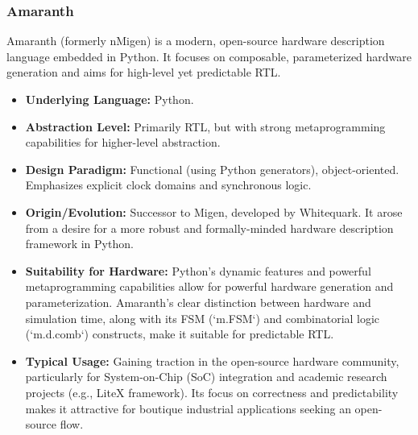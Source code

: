 \documentclass[sigconf, anonymous=false]{acmart} %
\begin{document}
\subsubsection{Amaranth}
Amaranth (formerly nMigen) is a modern, open-source hardware description language embedded in Python. It focuses on composable, parameterized hardware generation and aims for high-level yet predictable RTL.
\begin{itemize}
    \item \textbf{Underlying Language:} Python.
    \item \textbf{Abstraction Level:} Primarily RTL, but with strong metaprogramming capabilities for higher-level abstraction.
    \item \textbf{Design Paradigm:} Functional (using Python generators), object-oriented. Emphasizes explicit clock domains and synchronous logic.
    \item \textbf{Origin/Evolution:} Successor to Migen, developed by Whitequark. It arose from a desire for a more robust and formally-minded hardware description framework in Python.
    \item \textbf{Suitability for Hardware:} Python's dynamic features and powerful metaprogramming capabilities allow for powerful hardware generation and parameterization. Amaranth's clear distinction between hardware and simulation time, along with its FSM (`m.FSM`) and combinatorial logic (`m.d.comb`) constructs, make it suitable for predictable RTL.
    \item \textbf{Typical Usage:} Gaining traction in the open-source hardware community, particularly for System-on-Chip (SoC) integration and academic research projects (e.g., LiteX framework). Its focus on correctness and predictability makes it attractive for boutique industrial applications seeking an open-source flow.
\end{itemize}
\end{document}
